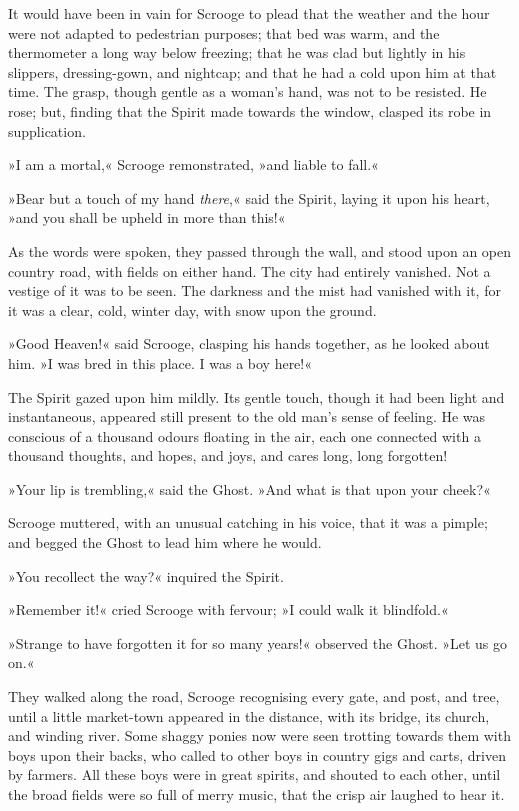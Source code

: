 It would have been in vain for Scrooge to plead that the weather and the hour were not adapted to pedestrian purposes; that bed was warm, and the thermometer a long way below freezing; that he was clad but lightly in his slippers, dressing-gown, and nightcap; and that he had a cold upon him at that time. The grasp, though gentle as a woman's hand, was not to be resisted. He rose; but, finding that the Spirit made towards the window, clasped its robe in supplication.

»I am a mortal,« Scrooge remonstrated, »and liable to fall.«

»Bear but a touch of my hand \textit{there},« said the Spirit, laying it upon his heart, »and you shall be upheld in more than this!«

As the words were spoken, they passed through the wall, and stood upon an open country road, with fields on either hand. The city had entirely vanished. Not a vestige of it was to be seen. The darkness and the mist had vanished with it, for it was a clear, cold, winter day, with snow upon the ground.

»Good Heaven!« said Scrooge, clasping his hands together, as he looked about him. »I was bred in this place. I was a boy here!«

The Spirit gazed upon him mildly. Its gentle touch, though it had been light and instantaneous, appeared still present to the old man's sense of feeling. He was conscious of a thousand odours floating in the air, each one connected with a thousand thoughts, and hopes, and joys, and cares long, long forgotten!

»Your lip is trembling,« said the Ghost. »And what is that upon your cheek?«

Scrooge muttered, with an unusual catching in his voice, that it was a pimple; and begged the Ghost to lead him where he would.

»You recollect the way?« inquired the Spirit.

»Remember it!« cried Scrooge with fervour; »I could walk it blindfold.«

»Strange to have forgotten it for so many years!« observed the Ghost. »Let us go on.«

They walked along the road, Scrooge recognising every gate, and post, and tree, until a little market-town appeared in the distance, with its bridge, its church, and winding river. Some shaggy ponies now were seen trotting towards them with boys upon their backs, who called to other boys in country gigs and carts, driven by farmers. All these boys were in great spirits, and shouted to each other, until the broad fields were so full of merry music, that the crisp air laughed to hear it.

